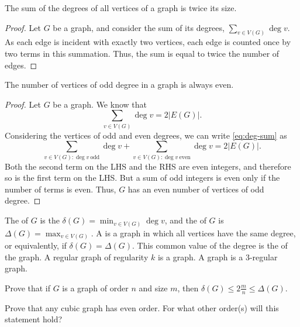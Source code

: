 \begin{Lemma}
The sum of the degrees of all vertices of a graph is twice its size.
\end{Lemma}

\begin{proof}
Let $G$ be a graph, and consider the sum of its degrees, $\sum_{v \in V(G)} \deg v$. As each edge is incident with exactly two vertices, each edge is counted once by two terms in this summation. Thus, the sum is equal to twice the number of edges.
\end{proof}

\begin{Corollary}
The number of vertices of odd degree in a graph is always even.
\end{Corollary}

\begin{proof}
Let $G$ be a graph. We know that
\begin{equation}
\sum_{v \in V(G)} \deg v = 2 |E(G)|. \label{eq:deg-sum}
\end{equation}
Considering the vertices of odd and even degrees, we can write \eqref{eq:deg-sum} as
\begin{equation}
\sum_{v \in V(G) : \deg v\ \text{odd}} \deg v + \sum_{v \in V(G) : \deg v\ \text{even}} \deg v = 2 |E(G)|.
\end{equation}
Both the second term on the LHS and the RHS are even integers, and therefore so is the first term on the LHS. But a sum of odd integers is even only if the number of terms is even. Thus, $G$ has an even number of vertices of odd degree.
\end{proof}

The  of $G$ is the $\delta(G) = \min_{v \in V(G)} \deg v$, and the  of $G$ is $\Delta(G) = \max_{v \in V(G)}$. A  is a graph in which all vertices have the same degree, or equivalently, if $\delta(G) = \Delta(G)$. This common value of the degree is the  of the graph. A regular graph of regularity $k$ is a  graph. A  graph is a $3$-regular graph.

\begin{Exercise}
Prove that if $G$ is a graph of order $n$ and size $m$, then $\delta(G) \le 2\frac m n \le \Delta(G)$.
\end{Exercise}

\begin{Exercise}
Prove that any cubic graph has even order. For what other order(s) will this statement hold?
\end{Exercise}


